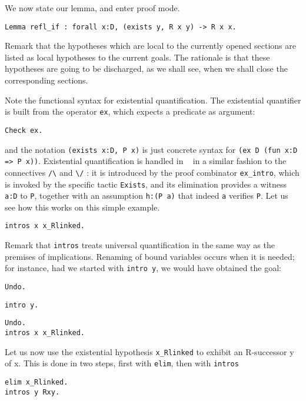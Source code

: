 \documentclass{book}
\begin{document}
We now state our lemma, and enter proof mode.
\begin{lstlisting}
Lemma refl_if : forall x:D, (exists y, R x y) -> R x x.
\end{lstlisting}

Remark that the hypotheses which are local to the currently opened sections
are listed as local hypotheses to the current goals.
The rationale is that these hypotheses are going to be discharged, as we
shall see, when we shall close the corresponding sections.

Note the functional syntax for existential quantification. The existential
quantifier is built from the operator \verb:ex:, which expects a 
predicate as argument:
\begin{lstlisting}
Check ex.
\end{lstlisting}
and the notation \verb+(exists x:D, P x)+ is just concrete syntax for 
\verb+(ex D (fun x:D => P x))+. 
Existential quantification is handled in \Coq~ in a similar
fashion to the connectives \verb:/\: and \verb:\/: : it is introduced by
the proof combinator \verb:ex_intro:, which is invoked by the specific 
tactic \verb:Exists:, and its elimination provides a witness \verb+a:D+ to
\verb:P:, together with an assumption \verb+h:(P a)+ that indeed \verb+a+
verifies \verb:P:. Let us see how this works on this simple example.
\begin{lstlisting}
intros x x_Rlinked.
\end{lstlisting}

Remark that \verb:intros: treats universal quantification in the same way
as the premises of implications. Renaming of bound variables occurs
when it is needed; for instance, had we started with \verb:intro y:,
we would have obtained the goal:
\begin{lstlisting}
Undo.
\end{lstlisting}
\begin{lstlisting}
intro y.
\end{lstlisting}
\begin{lstlisting}
Undo.
intros x x_Rlinked.
\end{lstlisting}

Let us now use the existential hypothesis \verb:x_Rlinked: to 
exhibit an R-successor y of x. This is done in two steps, first with
\verb:elim:, then with \verb:intros:

\begin{lstlisting}
elim x_Rlinked.
intros y Rxy.
\end{lstlisting}
\end{document}
